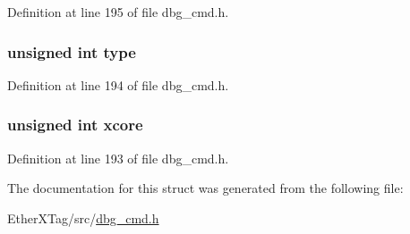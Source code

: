 Definition at line 195 of file dbg\-\_\-cmd.\-h.

\hypertarget{structdbg__cmd__type__reset_a4bfea42429249a1f65204f0c0f34704a}{
\subsubsection[{type}]{\setlength{\rightskip}{0pt plus 5cm}unsigned int type}}\label{structdbg__cmd__type__reset_a4bfea42429249a1f65204f0c0f34704a}


Definition at line 194 of file dbg\-\_\-cmd.\-h.

\hypertarget{structdbg__cmd__type__reset_a78357326dd562d441c3c73f5676ac638}{
\subsubsection[{xcore}]{\setlength{\rightskip}{0pt plus 5cm}unsigned int xcore}}\label{structdbg__cmd__type__reset_a78357326dd562d441c3c73f5676ac638}


Definition at line 193 of file dbg\-\_\-cmd.\-h.



The documentation for this struct was generated from the following file\-:\begin{DoxyCompactItemize}
\item 
Ether\-X\-Tag/src/\hyperlink{dbg__cmd_8h}{dbg\-\_\-cmd.\-h}\end{DoxyCompactItemize}

